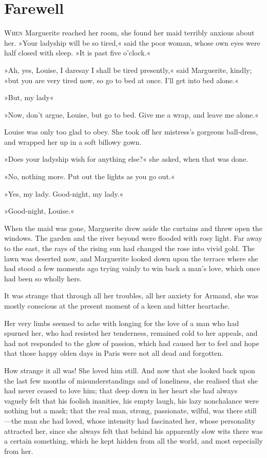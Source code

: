 
\chapter{Farewell}
\lettrine[lines=4]{W}{hen} Marguerite reached her room, she found her maid terribly anxious about her. »Your ladyship will be so tired,« said the poor woman, whose own eyes were half closed with sleep. »It is past five o'clock.«

»Ah, yes, Louise, I daresay I shall be tired presently,« said Marguerite, kindly; »but you are very tired now, so go to bed at once. I'll get into bed alone.«

»But, my lady\textellipsis«

»Now, don't argue, Louise, but go to bed. Give me a wrap, and leave me alone.«

Louise was only too glad to obey. She took off her mistress's gorgeous ball-dress, and wrapped her up in a soft billowy gown.

»Does your ladyship wish for anything else?« she asked, when that was done.

»No, nothing more. Put out the lights as you go out.«

»Yes, my lady. Good-night, my lady.«

»Good-night, Louise.«

When the maid was gone, Marguerite drew aside the curtains and threw open the windows. The garden and the river beyond were flooded with rosy light. Far away to the east, the rays of the rising sun had changed the rose into vivid gold. The lawn was deserted now, and Marguerite looked down upon the terrace where she had stood a few moments ago trying vainly to win back a man's love, which once had been so wholly hers.

It was strange that through all her troubles, all her anxiety for Armand, she was mostly conscious at the present moment of a keen and bitter heartache.

Her very limbs seemed to ache with longing for the love of a man who had spurned her, who had resisted her tenderness, remained cold to her appeals, and had not responded to the glow of passion, which had caused her to feel and hope that those happy olden days in Paris were not all dead and forgotten.

How strange it all was! She loved him still. And now that she looked back upon the last few months of misunderstandings and of loneliness, she realised that she had never ceased to love him; that deep down in her heart she had always vaguely felt that his foolish inanities, his empty laugh, his lazy nonchalance were nothing but a mask; that the real man, strong, passionate, wilful, was there still—the man she had loved, whose intensity had fascinated her, whose personality attracted her, since she always felt that behind his apparently slow wits there was a certain something, which he kept hidden from all the world, and most especially from her.

